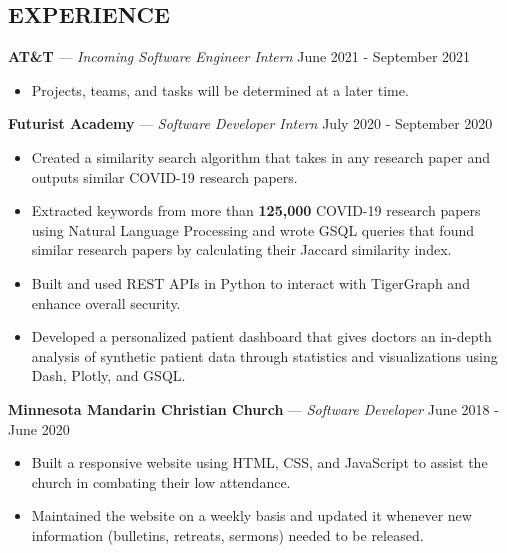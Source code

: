 \documentclass[11pt]{res}
\begin{document}
\begin{footnotesize}
\begin{resume}
\begin{small}
\section{EXPERIENCE}
\end{small}
\vspace{.5mm}
\textbf{AT\&T} — {\sl Incoming Software Engineer Intern} \hfill June 2021 - September 2021\vspace{-5mm}
\begin{itemize}[leftmargin=6.25mm] \itemsep -2pt 
\item Projects, teams, and tasks will be determined at a later time. 
\end{itemize}
\vspace{-2.5mm}
\textbf{Futurist Academy} — {\sl Software Developer Intern} \hfill July 2020 - September 2020\vspace{-5mm}
\begin{itemize}[leftmargin=6.25mm] \itemsep -2pt 
\item Created a similarity search algorithm that takes in any research paper and outputs similar COVID-19 research papers.
\vspace{1mm}
\item Extracted keywords from more than \textbf{125,000} COVID-19 research papers using Natural Language Processing and wrote GSQL queries that found similar research papers by calculating their Jaccard similarity index. 
\vspace{1mm}
\item Built and used REST APIs in Python to interact with TigerGraph and enhance overall security.
\vspace{1mm}
\item Developed a personalized patient dashboard that gives doctors an in-depth analysis of synthetic patient data through statistics and visualizations using Dash, Plotly, and GSQL.
\end{itemize}
\vspace{-2.5mm}
\textbf{Minnesota Mandarin Christian Church} — {\sl Software Developer} \hfill June 2018 - June 2020\vspace{-5mm}
\begin{itemize}[leftmargin=6.25mm] \itemsep -2pt 
\item Built a responsive website using HTML, CSS, and JavaScript to assist the church in combating their low attendance.
\vspace{1mm}
\item Maintained the website on a weekly basis and updated it whenever new information (bulletins, retreats, sermons) needed to be released. 

\end{itemize}
\end{resume}
\end{footnotesize}
\end{document}

